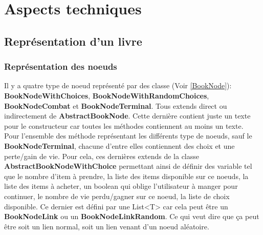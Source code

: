 \chapter{Aspects techniques}

	\section{Représentation d'un livre}

		\subsection{Représentation des noeuds}
			Il y a quatre type de noeud représenté par des classe (Voir \ref{BookNode}): \textbf{BookNodeWithChoices}, \textbf{BookNodeWithRandomChoices}, \textbf{BookNodeCombat} et \textbf{BookNodeTerminal}. Tous extends direct ou indirectement de \textbf{AbstractBookNode}. Cette dernière contient juste un texte pour le constructeur car toutes les méthodes contiennent au moins un texte.\\
			Pour l'ensemble des méthode représentant les différents type de noeuds, sauf le \textbf{BookNodeTerminal}, chacune d'entre elles contiennent des choix et une perte/gain de vie. Pour cela, ces dernières extends de la classe \textbf{AbstractBookNodeWithChoice} permettant ainsi de définir des variable tel que le nombre d'item à prendre, la liste des items disponible sur ce noeuds, la liste des items à acheter, un boolean qui oblige l'utilisateur à manger pour continuer, le nombre de vie perdu/gagner sur ce noeud, la liste de choix disponible. Ce dernier est défini par une List<T> car cela peut être un \textbf{BookNodeLink} ou un \textbf{BookNodeLinkRandom}. Ce qui veut dire que ça peut être soit un lien normal, soit un lien venant d'un noeud aléatoire.\\

